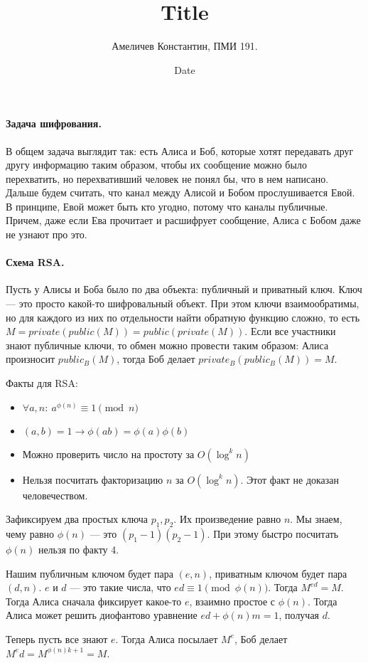 \documentclass[12pt]{article}
\title{Title}
\author{Амеличев Константин, ПМИ 191.}
\date{Date}
\begin{document}
\paragraph{Задача шифрования.} В общем задача выглядит так: есть Алиса и Боб, которые хотят передавать друг другу информацию таким образом, чтобы их сообщение можно было перехватить, но перехвативший человек не понял бы, что в нем написано. Дальше будем считать, что канал между Алисой и Бобом прослушивается Евой. В принципе, Евой может быть кто угодно, потому что каналы публичные. Причем, даже если Ева прочитает и расшифрует сообщение, Алиса с Бобом даже не узнают про это.

\paragraph{Схема RSA.} Пусть у Алисы и Боба было по два объекта: публичный и приватный ключ. Ключ --- это просто какой-то шифровальный объект. При этом ключи взаимообратимы, но для каждого из них по отдельности найти обратную функцию сложно, то есть $M = private(public(M)) = public(private(M))$. Если все участники знают публичные ключи, то обмен можно провести таким образом: Алиса произносит $public_B(M)$, тогда Боб делает $private_B(public_B(M)) = M$. 

Факты для RSA:
\begin{itemize}
\item $\forall a,n:\ a^{\phi(n)} \equiv 1 \pmod{n}$
\item $(a, b) = 1 \rightarrow \phi(ab) = \phi(a)\phi(b)$
\item Можно проверить число на простоту за $O(\log^k n)$
\item Нельзя посчитать факторизацию $n$ за $O(\log^k n)$. Этот факт не доказан человечеством.
\end{itemize}


Зафиксируем два простых ключа $p_1, p_2$. Их произведение равно $n$. Мы знаем, чему равно $\phi(n)$ --- это $(p_1 - 1)(p_2 - 1)$. При этому быстро посчитать $\phi(n)$ нельзя по факту 4.

Нашим публичным ключом будет пара $(e, n)$, приватным ключом будет пара $(d, n)$. $e$ и $d$ --- это такие числа, что $ed \equiv 1 \pmod{\phi(n)}$. Тогда $M^{ed} = M$. Тогда Алиса сначала фиксирует какое-то $e$, взаимно простое с $\phi(n)$. Тогда Алиса может решить диофантово уравнение $ed + \phi(n)m = 1$, получая $d$.

Теперь пусть все знают $e$. Тогда Алиса посылает $M^e$, Боб делает $M^ed = M^{\phi(n)k + 1} = M$.
\end{document}
